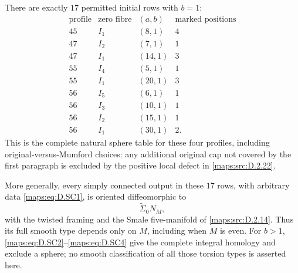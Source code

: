 \begin{theorem}
There are exactly $17$ permitted initial rows with $b=1$:
\[
\begin{array}{c|c|c|c}
 \text{profile}&\text{zero fibre}&(a,b)&\text{marked positions}\\\hline
 45&I_1&(8,1)&4\\
 47&I_2&(7,1)&1\\
 47&I_1&(14,1)&3\\
 55&I_4&(5,1)&1\\
 55&I_1&(20,1)&3\\
 56&I_5&(6,1)&1\\
 56&I_3&(10,1)&1\\
 56&I_2&(15,1)&1\\
 56&I_1&(30,1)&2.
\end{array}                                                 \tag{D.SC5}\label{maps:eq:D.SC5}
\]
This is the complete natural sphere table for these four profiles,
including original-versus-Mumford choices: any additional original
cap not covered by the first paragraph is excluded by the positive
local defect in \ref{maps:src:D.2.22}.

More generally, every simply connected output in these $17$ rows,
with arbitrary data \eqref{maps:eq:D.SC1}, is oriented diffeomorphic to
\[
                              \widetilde\Sigma_0N_M,         \tag{D.SC6}\label{maps:eq:D.SC6}
\]
with the twisted framing and the Smale five-manifold of \ref{maps:src:D.2.14}.
Thus its full smooth type depends only on $M$, including when $M$
is even. For $b>1$, \eqref{maps:eq:D.SC2}--\eqref{maps:eq:D.SC4} give the complete integral
homology and exclude a sphere; no smooth classification of all
those torsion types is asserted here.

\end{theorem}


